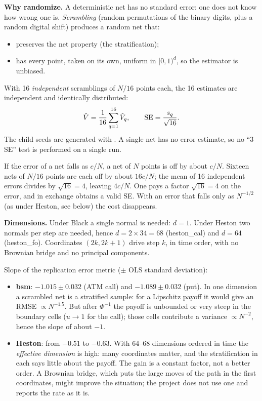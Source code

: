 \textbf{Why randomize.} A deterministic net has no standard error: one does not know how wrong one is.
\emph{Scrambling} (random permutations of the binary digits, plus a random digital shift) produces a random net that:
\begin{itemize}
\item preserves the net property (the stratification);
\item has every point, taken on its own, uniform in $[0,1)^d$, so the estimator is unbiased.
\end{itemize}
With 16 \emph{independent} scramblings of $N/16$ points each, the 16 estimates are independent and identically
distributed:
\[
\hat V=\frac1{16}\sum_{q=1}^{16}\hat V_q,\qquad\mathrm{SE}=\frac{s_q}{\sqrt{16}} .
\]
The child seeds are generated with . A single net has no error estimate, so no
``3 SE'' test is performed on a single run.

\begin{perche}[title={What splitting the budget into 16 nets costs}]
If the error of a net falls as $c/N$, a net of $N$ points is off by about $c/N$. Sixteen nets of $N/16$ points are
each off by about $16c/N$; the mean of 16 independent errors divides by $\sqrt{16}=4$, leaving $4c/N$. One pays a
factor $\sqrt{16}=4$ on the error, and in exchange obtains a valid SE. With an error that falls only as $N^{-1/2}$ (as
under Heston, see below) the cost disappears.
\end{perche}

\textbf{Dimensions.} Under Black a single normal is needed: $d=1$. Under Heston two normals per step are needed, hence
$d=2\times34=68$ (heston\_cal) and $d=64$ (heston\_fo). Coordinates $(2k,2k+1)$ drive step $k$, in time order, with no
Brownian bridge and no principal components.

\begin{progetto}[title={In the qpricer project: the empirical rate of Sobol'}]
Slope of the replication error metric ($\pm$ OLS standard deviation):
\begin{itemize}
\item \textbf{bsm}: $-1.015\pm0.032$ (ATM call) and $-1.089\pm0.032$ (put). In one dimension a scrambled net is a
stratified sample: for a Lipschitz payoff it would give an RMSE $\propto N^{-1.5}$. But after $\Phi^{-1}$ the payoff is
unbounded or very steep in the boundary cells ($u\to1$ for the call); those cells contribute a variance
$\propto N^{-2}$, hence the slope of about $-1$.
\item \textbf{Heston}: from $-0.51$ to $-0.63$. With 64--68 dimensions ordered in time the \emph{effective dimension}
is high: many coordinates matter, and the stratification in each says little about the payoff. The gain is a constant
factor, not a better order. A Brownian bridge, which puts the large moves of the path in the first coordinates, might
improve the situation; the project does not use one and reports the rate as it is.
\end{itemize}
\end{progetto}

